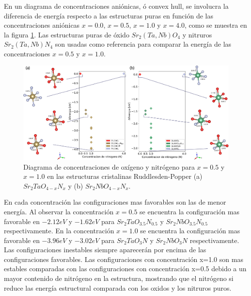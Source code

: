 En un diagrama de concentraciones aniónicas, ó convex hull, se involucra la diferencia de energía respecto a las estructuras puras en función de las concentraciones aniónicas $x=0.0$, $x=0.5$, $x=1.0$ y $x=4.0$, como se muestra en la figura \ref{Fig. concentraciones-totales}. Las estructuras puras de óxido $Sr_{2}(Ta,Nb)O_{4}$ y nitruros $Sr_{2}(Ta,Nb)N_{4}$ son usadas como referencia para comparar la energía de las concentraciones $x=0.5$ y $x=1.0$.

\begin{figure}[H]
    \centering
    \includegraphics[width=\textwidth]{Figs/convex_hull.png}
    \caption{Diagrama de concentraciones de oxígeno y nitrógeno para $x=0.5$ y $x=1.0$ en las estructuras cristalinas Ruddlesden-Popper (a) $Sr_{2}TaO_{4-x}N_{x}$ y (b) $Sr_{2}NbO_{4-x}N_{x}$.}
    \label{Fig. concentraciones-totales}
\end{figure}

En cada concentración las configuraciones mas favorables son las de menor energía. Al observar la concentración $x=0.5$ se encuentra la configuración mas favorable en $-2.12 eV$ y $-1.62 eV$ para $Sr_{2}TaO_{3.5}N_{0.5}$ y $Sr_{2}NbO_{3.5}N_{0.5}$ respectivamente. En la concentración $x=1.0$ se encuentra la configuración mas favorable en $-3.96 eV$ y $-3.02 eV$ para $Sr_{2}TaO_{3}N$ y $Sr_{2}NbO_{3}N$ respectivamente. Las configuraciones inestables siempre aparecerán por encima de las configuraciones favorables. Las configuraciones con concentración x=1.0 son mas estables comparadas con las configuraciones con concentración x=0.5 debido a un mayor contenido de nitrógeno en la estructura, mostrando que el nitrógeno si reduce las energía estructural comparada con los oxidos y los nitruros puros.

